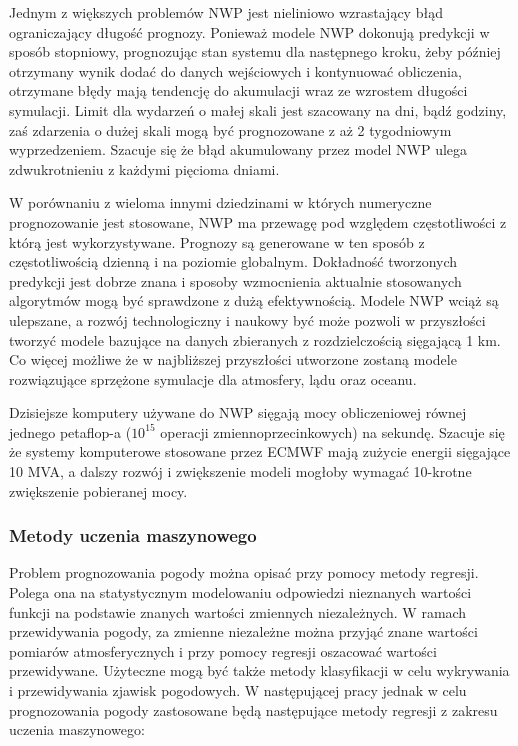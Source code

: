 Jednym z większych problemów NWP jest nieliniowo wzrastający błąd ograniczający długość prognozy.
Ponieważ modele NWP dokonują predykcji w sposób stopniowy, prognozując stan systemu dla następnego
kroku, żeby później otrzymany wynik dodać do danych wejściowych i kontynuować obliczenia, otrzymane błędy
mają tendencję do akumulacji wraz ze wzrostem długości symulacji.
Limit dla wydarzeń o małej skali jest szacowany na dni, bądź godziny, zaś zdarzenia o dużej skali
mogą być prognozowane z aż 2 tygodniowym wyprzedzeniem. Szacuje się że błąd akumulowany przez 
model NWP ulega zdwukrotnieniu z każdymi pięcioma dniami.

W porównaniu z wieloma innymi dziedzinami w których numeryczne prognozowanie jest stosowane,
NWP ma przewagę pod względem częstotliwości z którą jest wykorzystywane. Prognozy są generowane
w ten sposób z częstotliwością dzienną i na poziomie globalnym. Dokładność tworzonych predykcji jest
dobrze znana i sposoby wzmocnienia aktualnie stosowanych algorytmów mogą być sprawdzone z dużą
efektywnością. Modele NWP wciąż są ulepszane, a rozwój technologiczny i naukowy być może pozwoli
w przyszłości tworzyć modele bazujące na danych zbieranych z rozdzielczością sięgającą 1 km. Co więcej
możliwe że w najbliższej przyszłości utworzone zostaną modele rozwiązujące sprzężone symulacje
dla atmosfery, lądu oraz oceanu\cite{nwp-the-quiet-revolution}.

Dzisiejsze komputery używane do NWP sięgają mocy obliczeniowej równej jednego petaflop-a ($10^{15}$ operacji
zmiennoprzecinkowych) na sekundę. Szacuje się że systemy komputerowe stosowane przez ECMWF mają zużycie energii
sięgające 10 MVA, a dalszy rozwój i zwiększenie modeli mogłoby wymagać 10-krotne zwiększenie pobieranej mocy.


\subsubsection*{Metody uczenia maszynowego}

Problem prognozowania pogody można opisać przy pomocy metody regresji. Polega ona
na statystycznym modelowaniu odpowiedzi nieznanych wartości funkcji na podstawie
znanych wartości zmiennych niezależnych. W ramach przewidywania pogody, za zmienne niezależne
można przyjąć znane wartości pomiarów atmosferycznych i przy pomocy regresji oszacować 
wartości przewidywane. Użyteczne mogą być także metody klasyfikacji w celu wykrywania i 
przewidywania zjawisk pogodowych. W następującej pracy jednak w celu prognozowania pogody
zastosowane będą następujące metody regresji z zakresu uczenia maszynowego:


